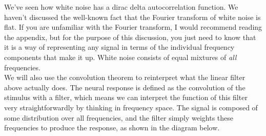 \documentclass{article}
\begin{document}
We've seen how white noise has a dirac delta autocorrelation function. We haven't discussed the well-known fact that the Fourier transform of white noise is flat. If you are unfamiliar with the Fourier transform, I would recommend reading the appendix, but for the purpose of this discussion, you just need to know that it is a way of representing any signal in terms of the individual frequency components that make it up. White noise consists of equal mixtures of \textit{all} frequencies.\\

We will also use the convolution theorem to reinterpret what the linear filter above actually does. The neural response is defined as the convolution of the stimulus with a filter, which means we can interpret the function of this filter very straightforwardly by thinking in frequency space. The signal is composed of some distribution over all frequencies, and the filter simply weights these frequencies to produce the response, as shown in the diagram below.

\begin{figure}[H]
	\centering

\end{figure}
\end{document}
